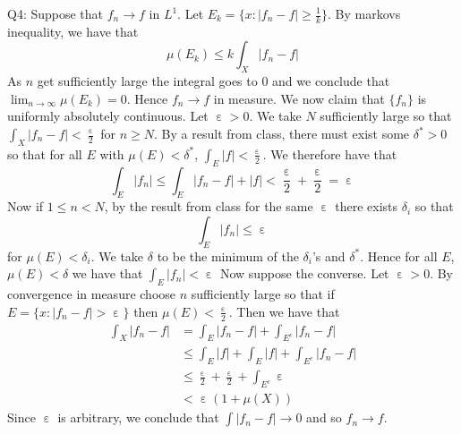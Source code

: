 \documentclass[letterpaper]{article}
\DeclareMathOperator{\ep}{\varepsilon}
\begin{document}
\noindent
Q4: Suppose that $f_n \to f$ in $L^1$. Let $E_k = \{x: |f_n-f| \geq \frac{1}{k}\}$. By markovs inequality, we have that $$\mu(E_k) \leq k \int_X |f_n-f|$$
As $n$ get sufficiently large the integral goes to $0$ and we conclude that $\lim_{n\to \infty} \mu(E_k)=0$. Hence $f_n \to f$ in measure. 
We now claim that $\{f_n\}$ is uniformly absolutely continuous. Let $\ep>0$. We take $N$ sufficiently large so that $\int_X |f_n-f| < \frac{\ep}{2}$ for $n \geq N$. By a result from class, there must exist some $\delta^\ast >0$ so that for all $E$ with $\mu(E) < \delta^\ast$, $\int_E |f| < \frac{\ep}{2}$. We therefore have that $$\int_{E} |f_n| \leq \int_{E} |f_n-f| + |f| < \frac{\ep}{2} + \frac{\ep}{2} = \ep$$ Now if $1 \leq n < N$, by the result from class for the same $\ep$ there exists $\delta_i$ so that $$\int_{E} |f_n| \leq \ep $$ for $\mu(E) < \delta_i$. We take $\delta$ to be the minimum of the $\delta_i$'s and $\delta^\ast$. Hence for all $E$, $\mu(E)<\delta$ we have that $\int_E |f_n| < \ep$ 
Now suppose the converse. Let $\ep>0$. By convergence in measure choose $n$ sufficiently large so that if $E = \{x: |f_n-f| > \ep \}$ then $\mu(E) < \frac{\ep}{2}$. Then we have that 
\begin{align*}
    \int_X |f_n - f| & = \int_E |f_n-f | + \int_{E^c} |f_n-f|
    \\ & \leq \int_E |f| + \int_E |f| + \int_{E^c} |f_n-f|
    \\ & \leq \frac{\ep}{2} + \frac{\ep}{2} + \int_{E^c} \ep
    \\ & < \ep (1+ \mu(X))
\end{align*}
Since $\ep$ is arbitrary, we conclude that $\int |f_n -f| \to 0$ and so $f_n \to f$. 
\end{document}

